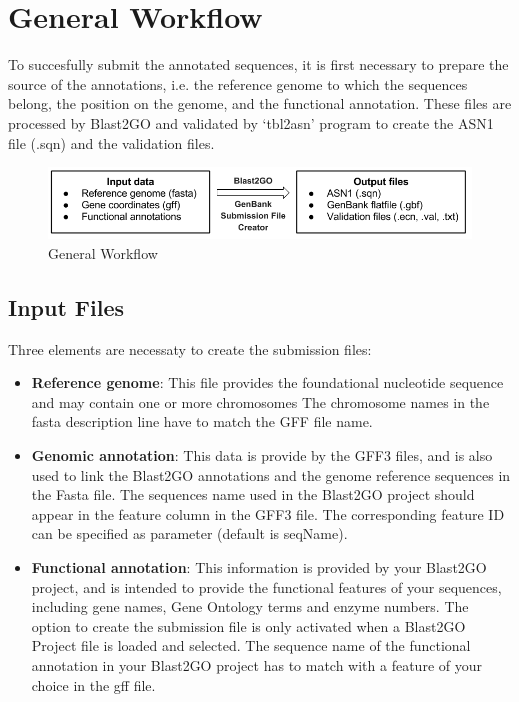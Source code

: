 \section{General Workflow}
To succesfully submit the annotated sequences, it is first necessary to prepare
the source of the annotations, i.e. the reference genome to
which the sequences belong, the position on the genome, and the functional
annotation. These files are processed by Blast2GO and validated by `tbl2asn'
program to create the ASN1 file (.sqn) and the validation files.

\begin{figure}[!h] \centering
\includegraphics[width=\textwidth]{img/Submission_workFlow.png}
\caption{General Workflow}
\label{fig:ncbisubworkflow}
\end{figure}
\newpage
\subsection{Input Files}
Three elements are necessaty to create the submission files:

\begin{itemize}
  \item \textbf{Reference genome}: This file provides the foundational
  nucleotide sequence and may contain one or more chromosomes The chromosome
  names in the fasta description line have to match the GFF file name.
  \item \textbf{Genomic annotation}: This data is provide by the GFF3 files, and
  is also used to link the Blast2GO annotations and the
  genome reference sequences in the Fasta file. The sequences name used in the 
  Blast2GO project should appear in the feature column in the GFF3 file. The 
  corresponding feature ID can be specified as parameter (default is seqName).
  \item \textbf{Functional annotation}: This information is provided by your
  Blast2GO project, and is intended to provide the functional features of your
  sequences, including gene names, Gene Ontology terms and enzyme numbers. The
  option to create the submission file is only activated when a Blast2GO
  Project file is loaded and selected.
  The sequence name of the functional annotation in your Blast2GO project has to
  match with a feature of your choice in the gff file.
\end{itemize}

